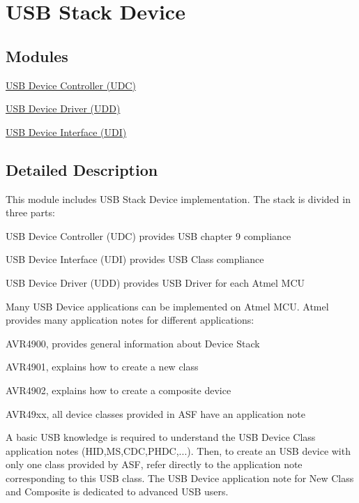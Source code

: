 \hypertarget{group__usb__device__group}{\section{U\-S\-B Stack Device}
\label{group__usb__device__group}
}
\subsection*{Modules}
\begin{DoxyCompactItemize}
\item 
\hyperlink{group__udc__group}{U\-S\-B Device Controller (\-U\-D\-C)}
\item 
\hyperlink{group__udd__group}{U\-S\-B Device Driver (\-U\-D\-D)}
\item 
\hyperlink{group__udi__group}{U\-S\-B Device Interface (\-U\-D\-I)}
\end{DoxyCompactItemize}


\subsection{Detailed Description}
This module includes U\-S\-B Stack Device implementation. The stack is divided in three parts\-:
\begin{DoxyItemize}
\item U\-S\-B Device Controller (U\-D\-C) provides U\-S\-B chapter 9 compliance
\item U\-S\-B Device Interface (U\-D\-I) provides U\-S\-B Class compliance
\item U\-S\-B Device Driver (U\-D\-D) provides U\-S\-B Driver for each Atmel M\-C\-U
\end{DoxyItemize}

Many U\-S\-B Device applications can be implemented on Atmel M\-C\-U. Atmel provides many application notes for different applications\-:
\begin{DoxyItemize}
\item A\-V\-R4900, provides general information about Device Stack
\item A\-V\-R4901, explains how to create a new class
\item A\-V\-R4902, explains how to create a composite device
\item A\-V\-R49xx, all device classes provided in A\-S\-F have an application note
\end{DoxyItemize}

A basic U\-S\-B knowledge is required to understand the U\-S\-B Device Class application notes (H\-I\-D,M\-S,C\-D\-C,P\-H\-D\-C,...). Then, to create an U\-S\-B device with only one class provided by A\-S\-F, refer directly to the application note corresponding to this U\-S\-B class. The U\-S\-B Device application note for New Class and Composite is dedicated to advanced U\-S\-B users. 